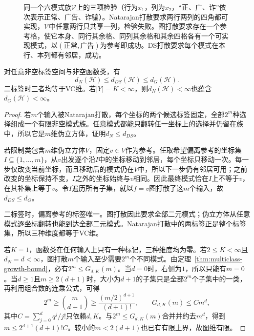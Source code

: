 \begin{figure}[htbp]
  \centering
  
  \caption{同一个六模式族$\mathcal V$上的三项检验（行为$x_1$，列为$x_2$，“正、广、诈”依次表示正常、广告、诈骗）。Natarajan打散要求两行两列的四角都可实现，$\mathcal V$中任意两行只共享一列，检验失败。图打散要求存在一个参考格，使它本身、同行其余格、同列其余格和其余四格各有一个可实现模式，以$(\text{正常},\text{广告})$为参考即成功。DS打散要求每个模式在本行、本列都有邻居，成功。}
  \label{fig:learning-multiclass-dimensions}
  \label{fig:lt6-three-shattering-quantifiers}
\end{figure}

\begin{theorem}[多分类维度的比较]
\label{thm:multiclass-dimension-comparison}
对任意非空标签空间与非空函数类，有
\[
  d_N(\mathcal H)\leq d_{DS}(\mathcal H)\leq d_G(\mathcal H).
\]
二标签时三者均等于VC维。若$|Y|=K<\infty$，则$d_N(\mathcal H)<\infty$也蕴含$d_G(\mathcal H)<\infty$。
\end{theorem}

\begin{proof}
若$m$个输入被Natarajan打散，每个坐标的两个候选标签固定，全部$2^m$种选择组成一个有限非空模式族。任意模式都能只翻转任一坐标上的选择并仍留在族中，所以它是$m$维伪立方体，证明$d_N\leq d_{DS}$。

若限制类包含$m$维伪立方体$V$，固定$v\in V$作为参考。任取希望偏离参考的坐标集$I\subseteq\{1,\ldots,m\}$，从$v$出发逐个沿$I$中的坐标移动到邻居，每个坐标只移动一次。每一步仅改变当前坐标，而且移动后的模式仍在$V$中，所以下一步仍有邻居可用；之前改变的坐标保持不变，$I$之外的坐标始终与$v$相同。因此最终模式恰在$I$上不等于$v$，在其补集上等于$v$。令$I$遍历所有子集，就以$f=v$图打散了这$m$个输入，故$d_{DS}\leq d_G$。

二标签时，偏离参考的标签唯一。图打散因此要求全部二元模式；伪立方体从任意模式逐坐标翻转也能到达全部二元模式。Natarajan打散中的两标签正是整个标签集，所以三种维度都等于VC维。

若$K=1$，函数类在任何输入上只有一种标记，三种维度均为零。若$2\leq K<\infty$且$d_N=d<\infty$，图打散$m$个输入至少需要$2^m$个不同模式。由定理~\ref{thm:multiclass-growth-bound}，必有$2^m\leq G_{d,K}(m)$。当$d=0$时，右侧为$1$，所以只能有$m=0$。当$d\geq1$且$m\geq2(d+1)$时，大小为$d+1$的子集只是全部$2^m$个子集中的一类，再利用组合数的连乘公式，可得
\[
 2^m\geq\binom m{d+1}\geq\frac{(m/2)^{d+1}}{(d+1)!},
 \qquad
 G_{d,K}(m)\leq C m^d,
\]
其中$C=\sum_{j=0}^d q^j/j!$只依赖$d,K$。与$2^m\leq G_{d,K}(m)$合并并约去$m^d$，得到$m\leq2^{d+1}(d+1)!C$。较小的$m<2(d+1)$也已有有限上界，故图维有限。
\end{proof}

